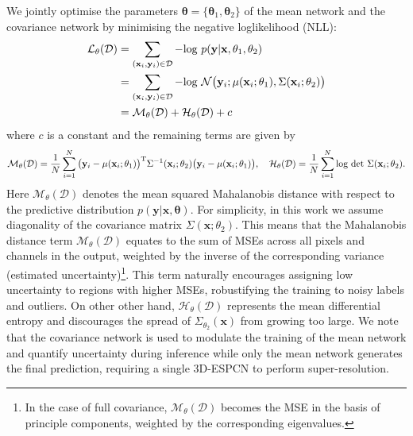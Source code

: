 We jointly optimise the parameters $\mathbf{\theta} = \{\mathbf{\theta}_1, \mathbf{\theta}_2\}$ of the mean network and the covariance network by minimising the negative loglikelihood (NLL): 
\begin{align}
\mathcal{L}_{\theta}(\mathcal{D}) 
&= \sum_{(\mathbf{x}_i,\mathbf{y}_i)\in\mathcal{D}}- \text{log } p(\mathbf{y}|\mathbf{x},\mathbf{\theta}_1, \mathbf{\theta}_2) \\
&= \sum_{(\mathbf{x}_i,\mathbf{y}_i)\in\mathcal{D}}- \text{log } \mathcal{N}\big{(}\mathbf{y}_i; \mu(\mathbf{x}_i;\mathbf{\theta}_1),\Sigma(\mathbf{x}_i;\mathbf{\theta}_2)\big{)} \\
&= \mathcal{M}_{\theta}(\mathcal{D}) + \mathcal{H}_{\theta}(\mathcal{D}) + c \label{eq:loss_hetero}
\end{align}
where $c$ is a constant and the remaining terms are given by
\begin{equation*}
\mathcal{M}_{\theta}(\mathcal{D}) = \frac{1}{N}\sum_{i=1}^{N}\big{(}\mathbf{y}_i-\mu(\mathbf{x}_i;\theta_1)\big{)}^\text{T}\Sigma^{-1}(\mathbf{x}_i;\theta_2)\big{(}\mathbf{y}_i-\mu(\mathbf{x}_i;\theta_1)\big{)}, \quad
\mathcal{H}_{\theta}(\mathcal{D}) = \frac{1}{N}\sum_{i=1}^{N}\text{log det }\Sigma( \mathbf{x}_i;\theta_2).
\end{equation*}
Here $\mathcal{M}_{\theta}(\mathcal{D})$ denotes the mean squared Mahalanobis distance with respect to the predictive distribution $p(\mathbf{y}|\mathbf{x},\mathbf{\theta})$. For simplicity, in this work we assume diagonality of the covariance matrix $\Sigma(\mathbf{x};\theta_2)$. This means that the Mahalanobis distance term $\mathcal{M}_{\theta}(\mathcal{D})$ equates to the sum of MSEs across all pixels and channels in the output, weighted by the inverse of the corresponding variance (estimated  uncertainty)\footnote{In the case of full covariance, $\mathcal{M}_{\theta}(\mathcal{D})$ becomes the MSE in the basis of principle components, weighted by the corresponding eigenvalues.}. This term naturally encourages assigning low uncertainty to regions with higher MSEs, robustifying the training to noisy labels and outliers. On other other hand, $\mathcal{H}_{\theta}(\mathcal{D})$ represents the mean differential entropy and discourages the spread of $\Sigma_{\theta_2}(\mathbf{x})$ from growing too large. We note that the covariance network is used to modulate the training of the mean network and quantify  uncertainty during inference while only the mean network generates the final prediction, requiring a single 3D-ESPCN to perform super-resolution. 

